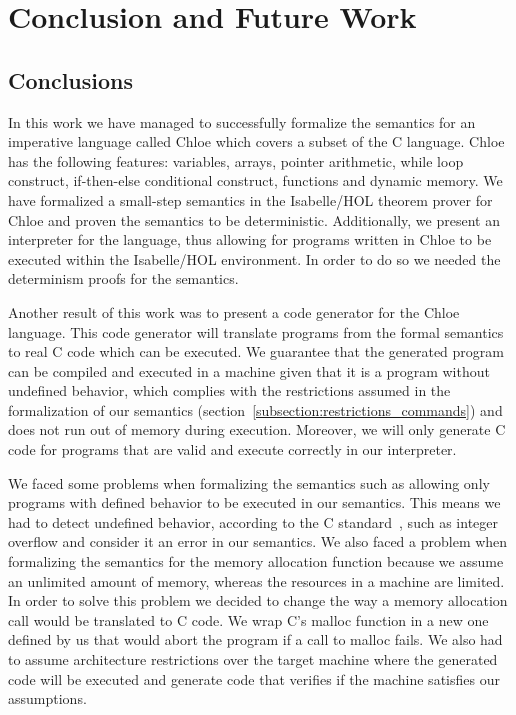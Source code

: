 \chapter{Conclusion and Future Work}\label{chapter:conclusion}

\section{Conclusions}

In this work we have managed to successfully formalize the semantics for an imperative language called Chloe which covers a subset of the C language.
Chloe has the following features: variables, arrays, pointer arithmetic, while loop construct, if-then-else conditional construct, functions and dynamic memory.
We have formalized a small-step semantics in the Isabelle/HOL theorem prover for Chloe and proven the semantics to be deterministic.
Additionally, we present an interpreter for the language, thus allowing for programs written in Chloe to be executed within the Isabelle/HOL environment.
In order to do so we needed the determinism proofs for the semantics.

Another result of this work was to present a code generator for the Chloe language.
This code generator will translate programs from the formal semantics to real C code which can be executed.
We guarantee that the generated program can be compiled and executed in a machine given that it is a program without undefined behavior, which complies with the restrictions assumed in the formalization of our semantics (section~\ref{subsection:restrictions_commands}) and does not run out of memory during execution.
Moreover, we will only generate C code for programs that are valid and execute correctly in our interpreter.

We faced some problems when formalizing the semantics such as allowing only programs with defined behavior to be executed in our semantics.
This means we had to detect undefined behavior, according to the C standard~\parencite{c99}, such as integer overflow and consider it an error in our semantics.
We also faced a problem when formalizing the semantics for the memory allocation function because we assume an unlimited amount of memory, whereas the resources in a machine are limited.
In order to solve this problem we decided to change the way a memory allocation call would be translated to C code.
We wrap C's malloc function in a new one defined by us that would abort the program if a call to malloc fails.
We also had to assume architecture restrictions over the target machine where the generated code will be executed and generate code that verifies if the machine satisfies our assumptions.


